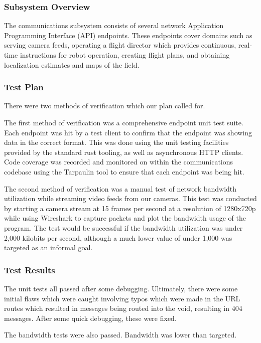 \subsubsection{Subsystem Overview}
The communications subsystem consists of several network Application Programming Interface (API)
endpoints.
These endpoints cover domains such as serving camera feeds, operating a flight director which
provides continuous, real-time instructions for robot operation, creating flight plans,
and obtaining localization estimates and maps of the field.

\subsubsection{Test Plan}
There were two methods of verification which our plan called for.

The first method of verification was a comprehensive endpoint unit test suite.
Each endpoint was hit by a test client to confirm that the endpoint was showing data in the correct
format.
This was done using the unit testing facilities provided by the standard rust tooling, as well as
asynchronous HTTP clients.
Code coverage was recorded and monitored on within the communications codebase using the
Tarpaulin\cite{tarpaulin} tool to ensure that each endpoint was being hit.

The second method of verification was a manual test of network bandwidth utilization while
streaming video feeds from our cameras.
This test was conducted by starting a camera stream at 15 frames per second at a resolution of
1280x720p while using Wireshark\cite{wireshark} to capture packets and plot the bandwidth usage of
the program.
The test would be successful if the bandwidth utilization was under 2,000 kilobits per second,
although a much lower value of under 1,000 was targeted as an informal goal.

\subsubsection{Test Results}
The unit tests all passed after some debugging.
Ultimately, there were some initial flaws which were caught involving typos which were made in the
URL routes which resulted in messages being routed into the void, resulting in 404 messages.
After some quick debugging, these were fixed.

The bandwidth tests were also passed.
Bandwidth was lower than targeted.